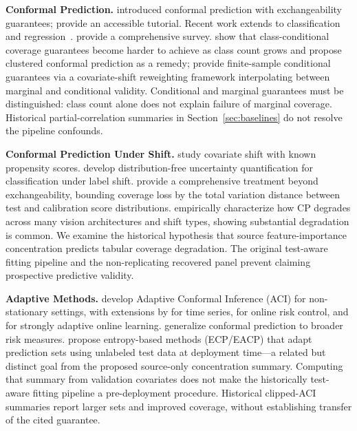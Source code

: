 \documentclass[accepted]{uai2026} %
\begin{document}
\textbf{Conformal Prediction.} \citet{vovk2005algorithmic} introduced conformal prediction with exchangeability guarantees; \citet{shafer2008tutorial} provide an accessible tutorial. Recent work extends to classification~\citep{romano2020classification,cauchois2021knowing} and regression~\citep{romano2019conformalized,lei2018distribution}. \citet{angelopoulos2023gentle} provide a comprehensive survey. \citet{ding2023class} show that class-conditional coverage guarantees become harder to achieve as class count grows and propose clustered conformal prediction as a remedy; \citet{gibbs2025conditional} provide finite-sample conditional guarantees via a covariate-shift reweighting framework interpolating between marginal and conditional validity. Conditional and marginal guarantees must be distinguished: class count alone does not explain failure of marginal coverage. Historical partial-correlation summaries in Section~\ref{sec:baselines} do not resolve the pipeline confounds.

\textbf{Conformal Prediction Under Shift.} \citet{tibshirani2019conformal} study covariate shift with known propensity scores. \citet{podkopaev2021distribution} develop distribution-free uncertainty quantification for classification under label shift. \citet{barber2023conformal} provide a comprehensive treatment beyond exchangeability, bounding coverage loss by the total variation distance between test and calibration score distributions. \citet{kasa2023empirically} empirically characterize how CP degrades across many vision architectures and shift types, showing substantial degradation is common. We examine the historical hypothesis that source feature-importance concentration predicts tabular coverage degradation. The original test-aware fitting pipeline and the non-replicating recovered panel prevent claiming prospective predictive validity.

\textbf{Adaptive Methods.} \citet{gibbs2021adaptive,gibbs2024conformal} develop Adaptive Conformal Inference (ACI) for non-stationary settings, with extensions by \citet{zaffran2022adaptive} for time series, \citet{feldman2023achieving} for online risk control, and \citet{bhatnagar2023improved} for strongly adaptive online learning. \citet{angelopoulos2024conformal} generalize conformal prediction to broader risk measures. \citet{kasa2025adapting} propose entropy-based methods (ECP/EACP) that adapt prediction sets using unlabeled test data at deployment time---a related but distinct goal from the proposed source-only concentration summary. Computing that summary from validation covariates does not make the historically test-aware fitting pipeline a pre-deployment procedure. Historical clipped-ACI summaries report larger sets and improved coverage, without establishing transfer of the cited guarantee.
\end{document}
